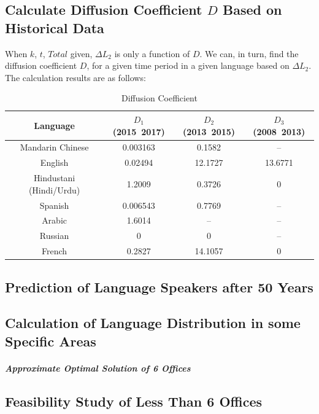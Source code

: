 \documentclass{mcmthesis}
\begin{document}
    \subsection{Calculate Diffusion Coefficient $D$ Based on Historical Data}%
    When $k$, $t$, $Total$ given, $\Delta L_2$ is only a function of $D$.
    We can, in turn, find the diffusion coefficient $D$,
    for a given time period in a given language based on $\Delta L_2$.
    The calculation results are as follows:

    \begin{table}[h]
      \centering
      \caption{Diffusion Coefficient}

      \begin{tabular}{cccc}
        \toprule%
        Language&$D_1$(2015~2017)&$D_2$(2013~2015)&$D_3$(2008~2013)\\
        \midrule%
        Mandarin Chinese&0.003163&0.1582&--\\
        English&0.02494&12.1727&13.6771\\
        Hindustani (Hindi/Urdu)&1.2009&0.3726&0\\
        Spanish&0.006543&0.7769&--\\
        Arabic&1.6014&--&--\\
        Russian&0&0&--\\
        French&0.2827&14.1057&0\\
        \bottomrule%
      \end{tabular}
    \end{table}

    \subsection{Prediction of Language Speakers after 50 Years}

    \subsection{Calculation of Language Distribution in some Specific Areas}

    \subparagraph{Approximate Optimal Solution of 6 Offices}%

    \subsection{Feasibility Study of Less Than 6 Offices}%
\end{document}
